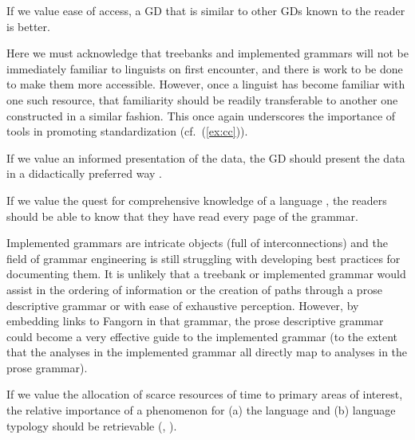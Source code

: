 \begin{exe}
 If we value ease of access, a GD that is similar
to other GDs known to the reader is better.
\end{exe}

Here we must acknowledge that treebanks and implemented grammars
will not be immediately familiar to linguists on first encounter,
and there is work to be done to make them more accessible.  However,
once a linguist has become familiar with one such resource, that
familiarity should be readily transferable to another one constructed
in a similar fashion.  This once again underscores the importance
of tools in promoting standardization (cf.\ (\ref{ex:cc})).

\begin{exe}
 If we value an informed presentation of the data,
the GD should present the data in a didactically preferred way
\cite[401]{Rice:06}.
\end{exe}

\begin{exe}
 If we value the quest
for comprehensive knowledge of a language \cite[162]{Cristofaro:06}, the
readers should be able to know that they have read every page of the grammar.
\end{exe}


Implemented grammars are intricate objects (full of interconnections)
and the field of grammar engineering is still struggling with
developing best practices for documenting them.  It is unlikely that a
treebank or implemented grammar would assist in the ordering of
information or the creation of paths through a prose descriptive
grammar or with ease of exhaustive perception.  However, by embedding
links to Fangorn in that grammar, the prose descriptive
grammar could become a very effective guide to the implemented grammar
(to the extent that the analyses in the implemented grammar all
directly map to analyses in the prose grammar).

\begin{exe}
 If we value the allocation of scarce
resources of time to primary areas of interest, the relative importance
of a phenomenon for (a) the language and (b) language typology should
be retrievable (, ).
\end{exe}


